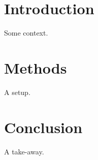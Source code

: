 \documentclass{article}
\begin{document}
\section{Introduction}
Some context.
\section{Methods}
A setup.
\section{Conclusion}
A take-away.
\end{document}

